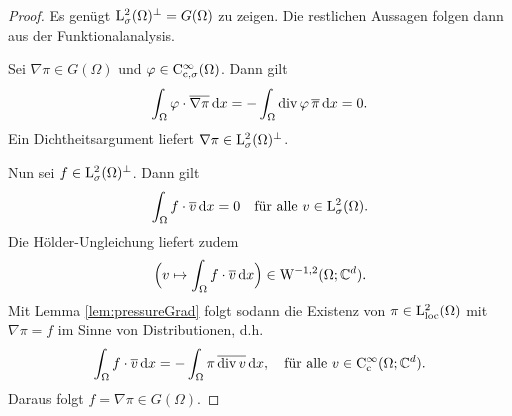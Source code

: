 \begin{proof}
  Es genügt $\mathrm{L}^2_\sigma(\Omega)^\perp = G(\Omega)$ zu zeigen.
  Die restlichen Aussagen folgen dann aus der Funktionalanalysis.
  
  Sei $\nabla\pi \in G(\Omega)$ und $\varphi \in \mathrm{C}_{\mathrm{c}, \sigma}^\infty(\Omega)$.
  Dann gilt
  $$
  \int_\Omega \varphi \cdot \overline{\nabla\pi} \, {\operatorname{d}\!{x}} = -\int_\Omega \mathrm{div\,} \varphi \, \overline \pi \, {\operatorname{d}\!{x}} = 0.
  $$
  Ein Dichtheitsargument liefert $\nabla \pi \in \mathrm{L}_\sigma^2(\Omega)^\perp$.

  Nun sei $f \in \mathrm{L}_\sigma^2(\Omega)^\perp$.
  Dann gilt 
  $$
  \int_\Omega f \cdot \overline v \, {\operatorname{d}\!{x}} = 0 \quad\text{für alle } v \in \mathrm{L}^2_\sigma(\Omega).
  $$
  Die Hölder-Ungleichung liefert zudem
  $$
  \Big( v \mapsto \int_\Omega f \cdot \overline v \, {\operatorname{d}\!{x}} \Big) \in \mathrm{W}^{-1,2}(\Omega;\mathbb{C}^d).
  $$
  Mit Lemma \ref{lem:pressureGrad} folgt sodann die Existenz von $\pi \in \mathrm{L}^2_{\operatorname{loc}}(\Omega)$ mit $\nabla \pi = f$ im Sinne von Distributionen, d.h.
  $$
  \int_\Omega f \cdot \overline v \, {\operatorname{d}\!{x}} 
  = - \int_\Omega \pi \, \overline{\mathrm{div\,} v} \, {\operatorname{d}\!{x}}, \quad \text{für alle } v \in \mathrm{C}_{\mathrm{c}}^\infty(\Omega; \mathbb{C}^d).
  $$
  Daraus folgt $f = \nabla \pi \in G(\Omega)$.
\end{proof}
